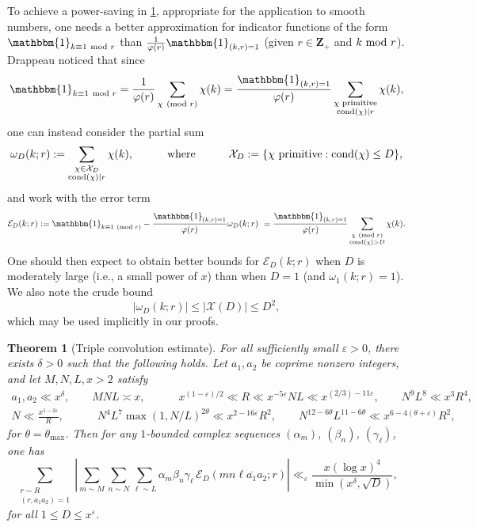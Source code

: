 \documentclass[reqno,11pt]{amsart}
\newtheorem{theorem}{Theorem}[section]
\theoremstyle{definition}
\theoremstyle{remark}
\numberwithin{equation}{section}
\newcommand{\Z}{\mathbf{Z}}
\newcommand{\mE}{\mathcal{E}}
\newcommand{\mX}{\mathcal{X}}
\newcommand{\one}{\mathbbm{1}}
\newcommand{\eps}{\varepsilon}
\renewcommand{\bar}{\overline}
\newcommand{\cond}{\textnormal{cond}}
\renewcommand{\mod}[1]{\ \textnormal{mod } #1}
\renewcommand{\pmod}[1]{\ (\textnormal{mod } #1)}
\begin{document}
To achieve a power-saving in \cref{thm:triple-conv-estimate}, appropriate for the application to smooth numbers, one needs a better approximation for indicator functions of the form $\one_{k \equiv 1 \mod{r}}$ than $\frac{1}{\varphi(r)}\one_{(k, r) = 1}$ (given $r \in \Z_+$ and $k \mod{r}$). Drappeau \cite{drappeau2015theoremes,drappeau2017smooth} noticed that since
\[
    \one_{k \equiv 1 \mod{r}} = \frac{1}{\varphi(r)} \sum_{\chi \pmod{r}} \chi(k) =
    \frac{\one_{(k, r) = 1}}{\varphi(r)}
    \sum_{\substack{\chi \text{ primitive} \\ \cond(\chi) \mid r}} \chi(k),
\]
one can instead consider the partial sum
\begin{equation} \label{eq:omega-d}
    \omega_D(k; r) := \sum_{\substack{\chi \in \mX_D \\ \cond(\chi) \mid r}} \chi(k),
    \qquad\quad
    \text{where}
    \qquad\quad
    \mX_D := \{\chi \text{ primitive} : \cond(\chi) \le D\},
\end{equation}
and work with the error term
\[
    \mE_D(k; r) := \one_{k \equiv 1 \pmod{r}} - \frac{\one_{(k,r) = 1}}{\varphi(r)} \omega_D(k; r)
    \ = 
    \frac{\one_{(k,r) = 1}}{\varphi(r)} \sum_{\substack{\chi \pmod{r} \\ \cond(\chi) > D}} \chi(k).
\]
One should then expect to obtain better bounds for $\mE_D(k; r)$ when $D$ is moderately large (i.e., a small power of $x$) than when $D = 1$ (and $\omega_1(k; r) = 1$). We also note the crude bound 
\[
    |\omega_D(k; r)| \le |\mX(D)| \le D^2,
\]
which may be used implicitly in our proofs.

\begin{theorem}[Triple convolution estimate] \label{thm:triple-conv-estimate}
For all sufficiently small $\eps > 0$, there exists $\delta > 0$ such that the following holds. Let $a_1, a_2$ be coprime nonzero integers, and let $M, N, L, x > 2$ satisfy
\begin{equation}\label{eq:conditions}
\begin{gathered}
    a_1, a_2 \ll x^\delta, 
    \qquad 
    MNL \asymp x,
    \qquad\quad 
    x^{(1-\eps)/2} \ll R \ll x^{-5\eps} NL \ll x^{(2/3) - 11\eps},
    \qquad 
    N^9 L^8 \ll x^3 R^4,
    \\
    N \ll \frac{x^{1-2\eps}}{R}, \qquad\quad N^4 L^7 \max(1, N/L)^{2\theta} \ll x^{2-16\eps}R^2, 
    \qquad 
    N^{12-6\theta} L^{11-6\theta} \ll x^{6-4(\theta+\eps)} R^2,
\end{gathered}
\end{equation}
for $\theta = \theta_{\max}$.
Then for any $1$-bounded complex sequences $(\alpha_m)$, $(\beta_n)$, $(\gamma_\ell)$, one has
\begin{equation} \label{eq:triple-conv-estimate}
    \sum_{\substack{r \sim R \\ (r, a_1a_2) = 1}}
    \left\vert \sum_{m \sim M} \sum_{n \sim N} \sum_{\ell \sim L} \alpha_m \beta_n \gamma_\ell\,
    \mE_D(mn\ell \bar{a_1} a_2; r)
    \right\vert
    \ll_\eps  
    \frac{x (\log x)^4}{\min\left(x^\delta, \sqrt{D}\right)},
\end{equation}
for all $1 \le D \le x^\eps$.
\end{theorem}
\end{document}
